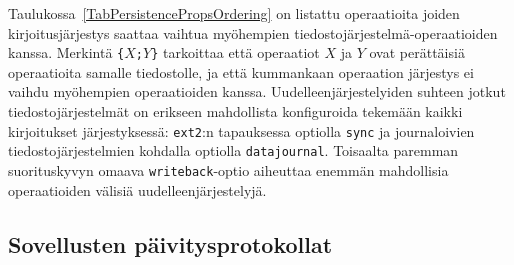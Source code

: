 Taulukossa~\ref{TabPersistencePropsOrdering} on listattu operaatioita joiden kirjoitusjärjestys saattaa vaihtua myöhempien tiedostojärjestelmä-operaatioiden kanssa.
Merkintä \texttt{\{}$X$\texttt{;}$Y$\texttt{\}} tarkoittaa että
operaatiot $X$ ja $Y$ ovat perättäisiä operaatioita samalle tiedostolle, ja että kummankaan operaation järjestys ei vaihdu myöhempien operaatioiden kanssa.
Uudelleenjärjestelyiden suhteen jotkut tiedostojärjestelmät on erikseen mahdollista konfiguroida tekemään kaikki kirjoitukset järjestyksessä:
\texttt{ext2}:n tapauksessa optiolla \texttt{sync} ja journaloivien tiedostojärjestelmien kohdalla optiolla \texttt{datajournal}.
Toisaalta paremman suorituskyvyn omaava \texttt{writeback}-optio aiheuttaa enemmän mahdollisia operaatioiden välisiä uudelleenjärjestelyjä.

%
%


\subsection{Sovellusten päivitysprotokollat}

